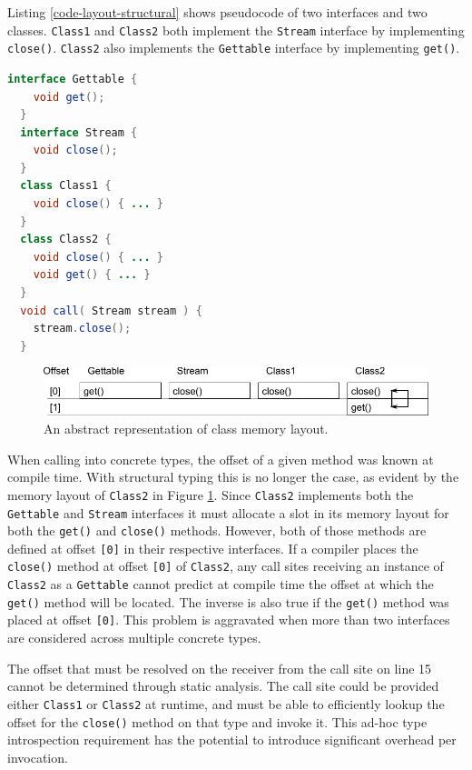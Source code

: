 Listing \ref{code-layout-structural} shows pseudocode of two interfaces and two classes.  \texttt{Class1} and \texttt{Class2} both implement the \texttt{Stream} interface by implementing \texttt{close()}.  \texttt{Class2} also implements the \texttt{Gettable} interface by implementing \texttt{get()}.

\begin{lstlisting}[language=Java,caption=Pseudocode: Java with structural types,label=code-layout-structural]
  interface Gettable {
    void get();
  }
  interface Stream {
    void close();
  }
  class Class1 {
    void close() { ... }
  }
  class Class2 {
    void close() { ... }
    void get() { ... }
  }
  void call( Stream stream ) {
    stream.close();
  }
\end{lstlisting}

\begin{figure}[htbp]
  \centering
    \includegraphics[width=\textwidth]{./Figures/memory-layout-structural.pdf}
  \caption[Structural Inheritance Layout]{An abstract representation of class memory layout.}
	\label{fig:memory-layout-structural}
\end{figure}

When calling into concrete types, the offset of a given method was known at compile time.  With structural typing this is no longer the case, as evident by the memory layout of \texttt{Class2} in Figure \ref{fig:memory-layout-structural}.  Since \texttt{Class2} implements both the \texttt{Gettable} and \texttt{Stream} interfaces it must allocate a slot in its memory layout for both the \texttt{get()} and \texttt{close()} methods.  However, both of those methods are defined at offset \texttt{[0]} in their respective interfaces.  If a compiler places the \texttt{close()} method at offset \texttt{[0]} of \texttt{Class2}, any call sites receiving an instance of \texttt{Class2} as a \texttt{Gettable} cannot predict at compile time the offset at which the \texttt{get()} method will be located.  The inverse is also true if the \texttt{get()} method was placed at offset \texttt{[0]}.  This problem is aggravated when more than two interfaces are considered across multiple concrete types.

The offset that must be resolved on the receiver from the call site on line 15 cannot be determined through static analysis.  The call site could be provided either \texttt{Class1} or \texttt{Class2} at runtime, and must be able to efficiently lookup the offset for the \texttt{close()} method on that type and invoke it.  This ad-hoc type introspection requirement has the potential to introduce significant overhead per invocation.

